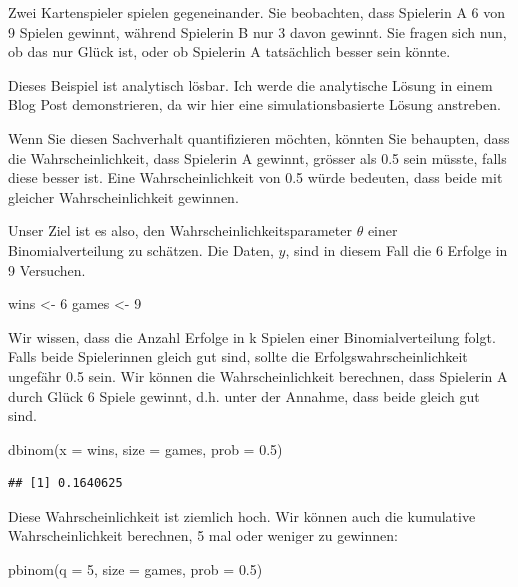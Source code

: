 \documentclass[]{tufte-handout}
\newenvironment{Shaded}{}{}
\newcommand{\AttributeTok}[1]{\textcolor[rgb]{0.49,0.56,0.16}{#1}}
\newcommand{\DecValTok}[1]{\textcolor[rgb]{0.25,0.63,0.44}{#1}}
\newcommand{\FloatTok}[1]{\textcolor[rgb]{0.25,0.63,0.44}{#1}}
\newcommand{\FunctionTok}[1]{\textcolor[rgb]{0.02,0.16,0.49}{#1}}
\newcommand{\NormalTok}[1]{#1}
\newcommand{\OtherTok}[1]{\textcolor[rgb]{0.00,0.44,0.13}{#1}}
\begin{document}
Zwei Kartenspieler spielen gegeneinander. Sie beobachten, dass Spielerin
A 6 von 9 Spielen gewinnt, während Spielerin B nur 3 davon gewinnt. Sie
fragen sich nun, ob das nur Glück ist, oder ob Spielerin A tatsächlich
besser sein könnte.

Dieses Beispiel ist analytisch lösbar. Ich werde die analytische Lösung
in einem Blog Post demonstrieren, da wir hier eine simulationsbasierte
Lösung anstreben.

Wenn Sie diesen Sachverhalt quantifizieren möchten, könnten Sie
behaupten, dass die Wahrscheinlichkeit, dass Spielerin A gewinnt,
grösser als 0.5 sein müsste, falls diese besser ist. Eine
Wahrscheinlichkeit von 0.5 würde bedeuten, dass beide mit gleicher
Wahrscheinlichkeit gewinnen.

Unser Ziel ist es also, den Wahrscheinlichkeitsparameter \(\theta\)
einer Binomialverteilung zu schätzen. Die Daten, \(y\), sind in diesem
Fall die 6 Erfolge in 9 Versuchen.

\begin{Shaded}
\begin{Highlighting}[]
\NormalTok{wins }\OtherTok{\textless{}{-}} \DecValTok{6}
\NormalTok{games }\OtherTok{\textless{}{-}} \DecValTok{9}
\end{Highlighting}
\end{Shaded}

Wir wissen, dass die Anzahl Erfolge in k Spielen einer
Binomialverteilung folgt. Falls beide Spielerinnen gleich gut sind,
sollte die Erfolgswahrscheinlichkeit ungefähr 0.5 sein. Wir können die
Wahrscheinlichkeit berechnen, dass Spielerin A durch Glück 6 Spiele
gewinnt, d.h. unter der Annahme, dass beide gleich gut sind.

\begin{Shaded}
\begin{Highlighting}[]
\FunctionTok{dbinom}\NormalTok{(}\AttributeTok{x =}\NormalTok{ wins, }\AttributeTok{size =}\NormalTok{ games, }\AttributeTok{prob =} \FloatTok{0.5}\NormalTok{)}
\end{Highlighting}
\end{Shaded}

\begin{verbatim}
## [1] 0.1640625
\end{verbatim}

Diese Wahrscheinlichkeit ist ziemlich hoch. Wir können auch die
kumulative Wahrscheinlichkeit berechnen, 5 mal oder weniger zu gewinnen:

\begin{Shaded}
\begin{Highlighting}[]
\FunctionTok{pbinom}\NormalTok{(}\AttributeTok{q =} \DecValTok{5}\NormalTok{, }\AttributeTok{size =}\NormalTok{ games, }\AttributeTok{prob =} \FloatTok{0.5}\NormalTok{)}
\end{Highlighting}
\end{Shaded}
\end{document}

